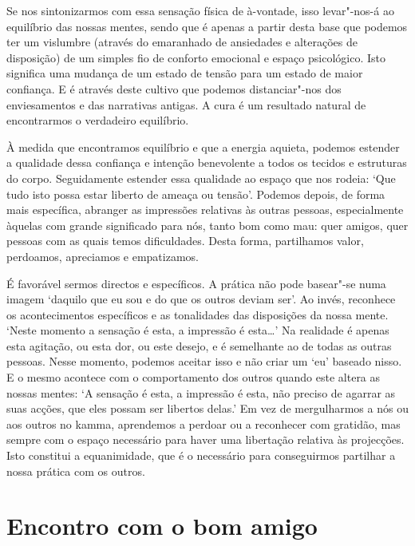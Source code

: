 Se nos sintonizarmos com essa sensação física de à-vontade, isso levar"-nos-á ao equilíbrio das nossas mentes, sendo que é apenas a partir desta base que podemos ter um vislumbre (através do emaranhado de ansiedades e alterações de disposição) de um simples fio de conforto emocional e espaço psicológico. Isto significa uma mudança de um estado de tensão para um estado de maior confiança. E é através deste cultivo que podemos distanciar"-nos dos enviesamentos e das narrativas antigas. A cura é um resultado natural de encontrarmos o verdadeiro equilíbrio.

À medida que encontramos equilíbrio e que a energia aquieta, podemos estender a qualidade dessa confiança e intenção benevolente a todos os tecidos e estruturas do corpo. Seguidamente estender essa qualidade ao espaço que nos rodeia: `Que tudo isto possa estar liberto de ameaça ou tensão'. Podemos depois, de forma mais específica, abranger as impressões relativas às outras pessoas, especialmente àquelas com grande significado para nós, tanto bom como mau: quer amigos, quer pessoas com as quais temos dificuldades. Desta forma, partilhamos valor, perdoamos, apreciamos e empatizamos.

É favorável sermos directos e específicos. A prática não pode basear"-se numa imagem `daquilo que eu sou e do que os outros deviam ser'. Ao invés, reconhece os acontecimentos específicos e as tonalidades das disposições da nossa mente. `Neste momento a sensação é esta, a impressão é esta\ldots{}' Na realidade é apenas esta agitação, ou esta dor, ou este desejo, e é semelhante ao de todas as outras pessoas. Nesse momento, podemos aceitar isso e não criar um `eu' baseado nisso. E o mesmo acontece com o comportamento dos outros quando este altera as nossas mentes: `A sensação é esta, a impressão é esta, não preciso de agarrar as suas acções, que eles possam ser libertos delas.' Em vez de mergulharmos a nós ou aos outros no kamma, aprendemos a perdoar ou a reconhecer com gratidão, mas sempre com o espaço necessário para haver uma libertação relativa às projecções. Isto constitui a equanimidade, que é o necessário para conseguirmos partilhar a nossa prática com os outros.

\section{Encontro com o bom amigo}

